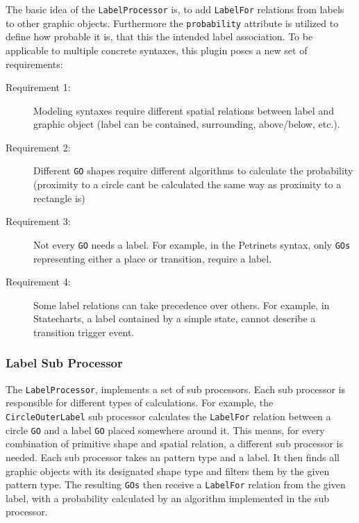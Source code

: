 The basic idea of the \texttt{LabelProcessor} is, to add \texttt{LabelFor} relations from labels to other graphic objects. Furthermore the \texttt{probability} attribute is utilized to define how probable it is, that this the intended label association. To be applicable to multiple concrete syntaxes, this plugin poses a new set of requirements:
\begin{description}
  \item[Requirement 1:] Modeling syntaxes require different spatial relations between label and graphic object (label can be contained, surrounding, above/below, etc.).
  \item[Requirement 2:] Different \texttt{GO} shapes require different algorithms to calculate the probability (proximity to a circle cant be calculated the same way as proximity to a rectangle is)
  \item[Requirement 3:] Not every \texttt{GO} needs a label. For example, in the Petrinets syntax, only \texttt{GOs} representing either a place or transition, require a label.
  \item[Requirement 4:]  Some label relations can take precedence over others. For example, in Statecharts, a label contained by a simple state, cannot describe a transition trigger event.
\end{description}

\subsubsection{Label Sub Processor}
The \texttt{LabelProcessor}, implements a set of sub processors. Each sub processor is responsible for different types of calculations. For example, the \texttt{CircleOuterLabel} sub processor calculates the \texttt{LabelFor} relation between a circle \texttt{GO} and a label \texttt{GO} placed somewhere around it. This means, for every combination of primitive shape and spatial relation, a different sub processor is needed. Each sub processor takes an pattern type and a label. It then finds all graphic objects with its designated shape type and filters them by the given pattern type. The resulting \texttt{GOs} then receive a \texttt{LabelFor} relation from the given label, with a probability calculated by an algorithm implemented in the sub processor.

